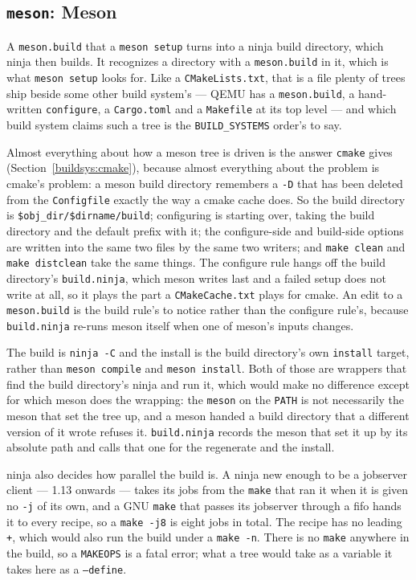 \documentclass{article}
\begin{document}
\subsection{\texttt{meson}: Meson \label{buildsys:meson}}

A \texttt{meson.build} that a \texttt{meson setup} turns into a ninja
build directory, which ninja then builds.  It recognizes a directory
with a \texttt{meson.build} in it, which is what \texttt{meson setup}
looks for.  Like a \texttt{CMakeLists.txt}, that is a file plenty of
trees ship beside some other build system's --- QEMU has a
\texttt{meson.build}, a hand-written \texttt{configure}, a
\texttt{Cargo.toml} and a \texttt{Makefile} at its top level --- and
which build system claims such a tree is the \texttt{BUILD\_SYSTEMS}
order's to say.

Almost everything about how a meson tree is driven is the answer
\texttt{cmake} gives (Section~\ref{buildsys:cmake}), because almost
everything about the problem is cmake's problem: a meson build
directory remembers a \texttt{-D} that has been deleted from the
\texttt{Configfile} exactly the way a cmake cache does.  So the build
directory is \texttt{\$obj\_dir/\$dirname/build}; configuring is
starting over, taking the build directory and the default prefix with
it; the configure-side and build-side options are written into the
same two files by the same two writers; and \texttt{make clean} and
\texttt{make distclean} take the same things.  The configure rule
hangs off the build directory's \texttt{build.ninja}, which meson
writes last and a failed setup does not write at all, so it plays the
part a \texttt{CMakeCache.txt} plays for cmake.  An edit to a
\texttt{meson.build} is the build rule's to notice rather than the
configure rule's, because \texttt{build.ninja} re-runs meson itself
when one of meson's inputs changes.

The build is \texttt{ninja -C} and the install is the build
directory's own \texttt{install} target, rather than \texttt{meson
compile} and \texttt{meson install}.  Both of those are wrappers that
find the build directory's ninja and run it, which would make no
difference except for which meson does the wrapping: the
\texttt{meson} on the \texttt{PATH} is not necessarily the meson that
set the tree up, and a meson handed a build directory that a
different version of it wrote refuses it.  \texttt{build.ninja}
records the meson that set it up by its absolute path and calls that
one for the regenerate and the install.

ninja also decides how parallel the build is.  A ninja new enough to
be a jobserver client --- 1.13 onwards --- takes its jobs from the
\texttt{make} that ran it when it is given no \texttt{-j} of its own,
and a GNU \texttt{make} that passes its jobserver through a fifo hands
it to every recipe, so a \texttt{make -j8} is eight jobs in total.
The recipe has no leading \texttt{+}, which would also run the build
under a \texttt{make -n}.  There is no \texttt{make} anywhere in the
build, so a \texttt{MAKEOPS} is a fatal error; what a tree would take
as a variable it takes here as a \texttt{--define}.
\end{document}
